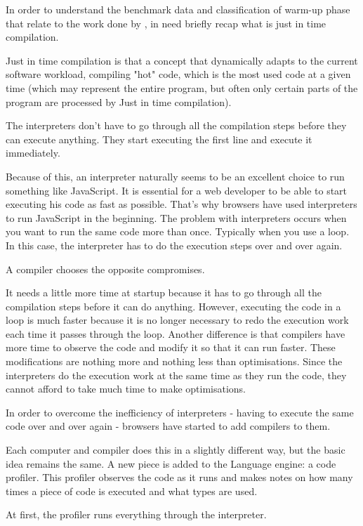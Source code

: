 \documentclass[12pt,a4paper]{article}
\begin{document}
In order to understand the benchmark data and classification of warm-up phase that relate to the work done by \citep{barrett2017virtual}, in need briefly recap what is just in time compilation.

Just in time compilation \citep{aycock2003brief} is that a concept that dynamically adapts to the current software workload, compiling "hot" code, which is the most used code at a given time (which may represent the entire program, but often only certain parts of the program are processed by Just in time compilation).

The interpreters don't have to go through all the compilation steps before they can execute anything. They start executing the first line and execute it immediately.

Because of this, an interpreter naturally seems to be an excellent choice to run something like JavaScript. It is essential for a web developer to be able to start executing his code as fast as possible. That's why browsers have used interpreters to run JavaScript in the beginning.
The problem with interpreters occurs when you want to run the same code more than once. Typically when you use a loop. In this case, the interpreter has to do the execution steps over and over again.

A compiler chooses the opposite compromises.

It needs a little more time at startup because it has to go through all the compilation steps before it can do anything. However, executing the code in a loop is much faster because it is no longer necessary to redo the execution work each time it passes through the loop.
Another difference is that compilers have more time to observe the code and modify it so that it can run faster. These modifications are nothing more and nothing less than optimisations. Since the interpreters do the execution work at the same time as they run the code, they cannot afford to take much time to make optimisations.

In order to overcome the inefficiency of interpreters - having to execute the same code over and over again - browsers have started to add compilers to them.

Each computer and compiler does this in a slightly different way, but the basic idea remains the same. A new piece is added to the Language engine: a code profiler. This profiler observes the code as it runs and makes notes on how many times a piece of code is executed and what types are used.

At first, the profiler runs everything through the interpreter.
\end{document}

